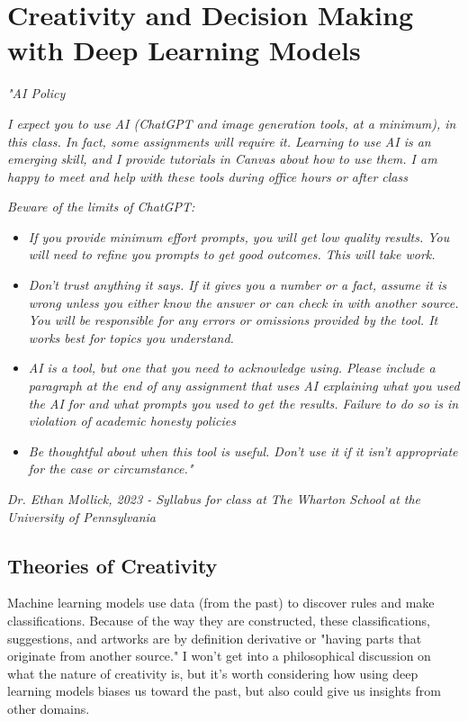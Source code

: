 
\chapter{Creativity and Decision Making with Deep Learning Models}

\textit{"AI Policy}

\textit{I expect you to use AI (ChatGPT and image generation tools, at a minimum), in this class. In fact, some assignments will require it. Learning to use AI is an emerging skill, and I provide tutorials in Canvas about how to use them. I am happy to meet and help with these tools during office hours or after class}

\textit{Beware of the limits of ChatGPT:}

\begin{itemize}
	\item\textit{If you provide minimum effort prompts, you will get low quality results. You will need to refine you prompts to get good outcomes. This will take work.}
	\item\textit{Don't trust anything it says. If it gives you a number or a fact, assume it is wrong unless you either know the answer or can check in with another source. You will be responsible for any errors or omissions provided by the tool. It works best for topics you understand.}
	\item\textit{AI is a tool, but one that you need to acknowledge using. Please include a paragraph at the end of any assignment that uses AI explaining what you used the AI for and what prompts you used to get the results. Failure to do so is in violation of academic honesty policies}
	\item\textit{Be thoughtful about when this tool is useful. Don't use it if it isn't appropriate for the case or circumstance."}
\end{itemize}

\textit{Dr. Ethan Mollick, 2023 - Syllabus for class at The Wharton School at the University of Pennsylvania}


\section{Theories of Creativity}

Machine learning models use data (from the past) to discover rules and make classifications. Because of the way they are constructed, these classifications, suggestions, and artworks are by definition derivative or "having parts that originate from another source." I won’t get into a philosophical discussion on what the nature of creativity is, but it’s worth considering how using deep learning models biases us toward the past, but also could give us insights from other domains.

